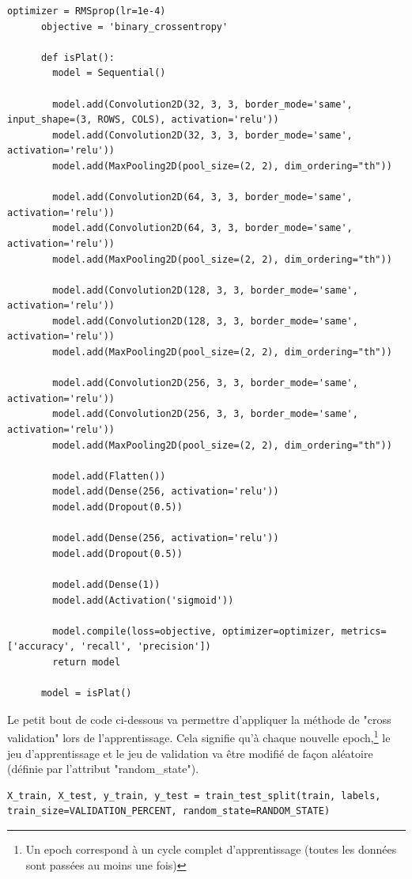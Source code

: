 \documentclass[a4paper,12pt]{report}
\begin{document}
      \begin{lstlisting}[title=cookedDishModel.py (l.133)]
      optimizer = RMSprop(lr=1e-4)
      objective = 'binary_crossentropy'

      def isPlat():
        model = Sequential()

        model.add(Convolution2D(32, 3, 3, border_mode='same', input_shape=(3, ROWS, COLS), activation='relu'))
        model.add(Convolution2D(32, 3, 3, border_mode='same', activation='relu'))
        model.add(MaxPooling2D(pool_size=(2, 2), dim_ordering="th"))

        model.add(Convolution2D(64, 3, 3, border_mode='same', activation='relu'))
        model.add(Convolution2D(64, 3, 3, border_mode='same', activation='relu'))
        model.add(MaxPooling2D(pool_size=(2, 2), dim_ordering="th"))
        
        model.add(Convolution2D(128, 3, 3, border_mode='same', activation='relu'))
        model.add(Convolution2D(128, 3, 3, border_mode='same', activation='relu'))
        model.add(MaxPooling2D(pool_size=(2, 2), dim_ordering="th"))
        
        model.add(Convolution2D(256, 3, 3, border_mode='same', activation='relu'))
        model.add(Convolution2D(256, 3, 3, border_mode='same', activation='relu'))
        model.add(MaxPooling2D(pool_size=(2, 2), dim_ordering="th"))

        model.add(Flatten())
        model.add(Dense(256, activation='relu'))
        model.add(Dropout(0.5))
        
        model.add(Dense(256, activation='relu'))
        model.add(Dropout(0.5))

        model.add(Dense(1))
        model.add(Activation('sigmoid'))

        model.compile(loss=objective, optimizer=optimizer, metrics=['accuracy', 'recall', 'precision'])
        return model

      model = isPlat()
      \end{lstlisting}

      \medbreak
      Le petit bout de code ci-dessous va permettre d'appliquer la méthode de "cross validation" lors de l'apprentissage. Cela signifie qu'à chaque nouvelle epoch,\footnote{Un epoch correspond à un cycle complet d'apprentissage (toutes les données sont passées au moins une fois)} le jeu d'apprentissage et le jeu de validation va être modifié de façon aléatoire (définie par l'attribut "random\_state").
      \begin{lstlisting}[title=cookedDishModel.py (l.175)]
      X_train, X_test, y_train, y_test = train_test_split(train, labels, train_size=VALIDATION_PERCENT, random_state=RANDOM_STATE)
      \end{lstlisting}
\end{document}
